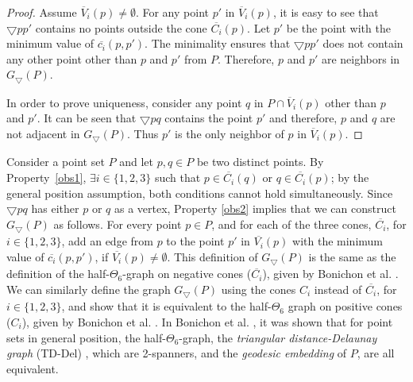 \begin{proof}
Assume $\overline{V}_i(p) \ne \emptyset$. For any point $p'$ in $\overline{V}_i(p)$, it is easy to see that $\bigtriangledown pp'$ contains no points 
outside the cone $\overline{C_i}(p)$. Let $p'$ be the point with the minimum value of $\overline{c_i}(p, p')$. The minimality ensures that 
$\bigtriangledown pp'$ does not contain any other point other than $p$ and $p'$ from $P$. Therefore, $p$ and $p'$ are neighbors in $G_\bigtriangledown(P)$.

In order to prove uniqueness, consider any point $q$ in $P \cap \overline{V}_i(p)$ other than $p$ and $p'$. 
It can be seen that $\bigtriangledown pq$ contains the point $p'$ and therefore, $p$ and $q$ are not adjacent in $G_\bigtriangledown(P)$. 
Thus $p'$ is the only neighbor of $p$ in $\overline{V}_i(p)$.
\end{proof}
Consider a point set $P$ and let $p, q \in P$ be two distinct points. By Property~\ref{obs1}, $\exists i \in \{1, 2, 3\}$ such that 
$p \in \overline{C_i}(q)$ or $q \in \overline{C_i}(p)$; by the general position assumption, both conditions cannot hold simultaneously. 
Since $\bigtriangledown pq$ has either $p$ or $q$ as a vertex, Property \ref{obs2} implies that we can construct $G_\bigtriangledown(P)$ as follows. 
For every point $p \in P$, and for each of the three cones, $\overline{C_i}$, for $i \in \{1, 2, 3\}$, add an edge from  $p$ to the point $p'$ 
in $\overline{V_i}(p)$ with the minimum value of $\overline{c_i}(p, p')$, if $\overline{V_i}(p)\ne \emptyset$. This definition of $G_\bigtriangledown(P)$ 
is the same as the definition of the half-$\Theta_6$-graph on negative cones ($\overline{C_i}$), given by Bonichon et al. \cite{Bonichon2010}. 
We can similarly define the graph $G_\bigtriangledown(P)$ using the cones ${C_i}$ instead of $\overline{C_i}$, for $i \in \{1, 2, 3\}$, and show that 
it is equivalent 
to the half-$\Theta_6$ graph on positive cones ($C_i$), given by Bonichon et al. \cite{Bonichon2010}. 
In Bonichon et al. \cite{Bonichon2010}, it was shown that for point sets in general position, the half-$\Theta_6$-graph, the {\em triangular 
distance-Delaunay graph} (TD-Del) \cite{Chew1989}, which are 2-spanners, and the {\em geodesic embedding} of $P$, are all equivalent. 

